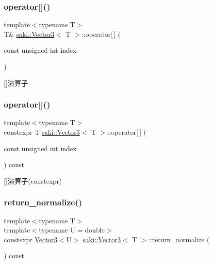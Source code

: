 \subsubsection{\texorpdfstring{operator[]()}{operator[]()}\hspace{0.1cm}{\footnotesize\ttfamily [1/2]}}
{\footnotesize\ttfamily template$<$typename T$>$ \\
T\& \mbox{\hyperlink{classsaki_1_1_vector3}{saki\+::\+Vector3}}$<$ T $>$\+::operator\mbox{[}$\,$\mbox{]} (\begin{DoxyParamCaption}\item[{const unsigned int}]{index }\end{DoxyParamCaption})\hspace{0.3cm}{\ttfamily [inline]}}



\mbox{[}\mbox{]}演算子 

\mbox{\label{classsaki_1_1_vector3_a4b41b5e2569a245144e0b0b2c84470b6}} 
\subsubsection{\texorpdfstring{operator[]()}{operator[]()}\hspace{0.1cm}{\footnotesize\ttfamily [2/2]}}
{\footnotesize\ttfamily template$<$typename T$>$ \\
constexpr T \mbox{\hyperlink{classsaki_1_1_vector3}{saki\+::\+Vector3}}$<$ T $>$\+::operator\mbox{[}$\,$\mbox{]} (\begin{DoxyParamCaption}\item[{const unsigned int}]{index }\end{DoxyParamCaption}) const\hspace{0.3cm}{\ttfamily [inline]}}



\mbox{[}\mbox{]}演算子(constexpr) 

\mbox{\label{classsaki_1_1_vector3_aba9ad0892e1219ced218a194afa18d14}} 
\subsubsection{\texorpdfstring{return\+\_\+normalize()}{return\_normalize()}}
{\footnotesize\ttfamily template$<$typename T$>$ \\
template$<$typename U  = double$>$ \\
constexpr \mbox{\hyperlink{classsaki_1_1_vector3}{Vector3}}$<$U$>$ \mbox{\hyperlink{classsaki_1_1_vector3}{saki\+::\+Vector3}}$<$ T $>$\+::return\+\_\+normalize (\begin{DoxyParamCaption}{ }\end{DoxyParamCaption}) const\hspace{0.3cm}{\ttfamily [inline]}}



